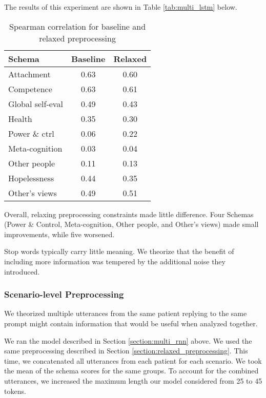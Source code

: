 \documentclass[11pt,a4paper]{article}
\begin{document}
The results of this experiment are shown in Table \ref{tab:multi_lstm} below.

\begin{table}[H]
\centering
\begin{tabular}{lcc}
\toprule
Schema                  &Baseline          &Relaxed \\ %
\midrule
Attachment              & 0.63 & 0.60\\
Competence              & 0.63 & 0.61\\
Global self-eval        & 0.49 & 0.43\\
Health                  & 0.35 & 0.30\\
Power \& ctrl           & 0.06 & 0.22\\
Meta-cognition          & 0.03 & 0.04\\
Other people            & 0.11 & 0.13\\
Hopelessness            & 0.44 & 0.35\\
Other's views           & 0.49 & 0.51\\
\bottomrule
\end{tabular}
\caption{Spearman correlation for baseline and relaxed preprocessing}
\label{tab:relaxed_preprocessing}
\end{table}

Overall, relaxing preprocessing constraints made little difference. Four Schemas (Power \& Control, Meta-cognition, Other people, and Other's views) made small improvements, while five worsened. 

Stop words typically carry little meaning. We theorize that the benefit of including more information was tempered by the additional noise they introduced.

\subsubsection{Scenario-level Preprocessing}
We theorized multiple utterances from the same patient replying to the same prompt might contain information that would be useful when analyzed together.  

We ran the model described in Section \ref{section:multi_rnn} above. We used the same preprocessing described in Section \ref{section:relaxed_preprocessing}. This time, we concatenated all utterances from each patient for each scenario. We took the mean of the schema scores for the same groups. To account for the combined utterances, we increased the maximum length our model considered from 25 to 45 tokens. 
\end{document}
